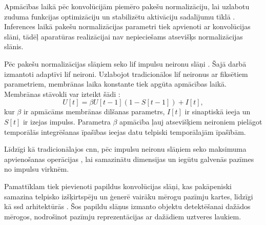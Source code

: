 Apmācības laikā pēc konvolūcijām piemēro pakešu normalizāciju, lai uzlabotu zuduma funkcijas optimizāciju un stabilizētu aktivāciju sadalījumu tīklā \cite{ioffe2015}. Inferences laikā pakešu normalizācijas parametri tiek apvienoti ar konvolūcijas slāni, tādēļ aparatūras realizācijai nav nepieciešams atsevišķs normalizācijas slānis.

Pēc pakešu normalizācijas slāņiem seko \Gls{lif} impulsu neironu slāņi \cite{Fang2021}. Šajā darbā izmantoti adaptīvi \Gls{lif} neironi. Uzlabojot tradicionālos \Gls{lif} neironus ar fiksētiem parametriem, membrānas laika konstante tiek apgūta apmācības laikā. Membrānas stāvokli var izteikt šādi \cite{Fang2021}:
\begin{equation}
    U[t] = \beta U[t-1](1-S[t-1]) + I[t],
\end{equation}
kur \(\beta\) ir apmācāms membrānas dilšanas parametrs, \(I[t]\) ir sinaptiskā ieeja un \(S[t]\) ir izejas impulss. Parametra \(\beta\) apmācība ļauj atsevišķiem neironiem pielāgot temporālās integrēšanas īpašības ieejas datu telpiski temporālajām īpašībām.

Līdzīgi kā tradicionālajos \Gls{cnn}, pēc impulsu neironu slāņiem seko maksimuma apvienošanas operācijas \cite{Fang2021}, lai
samazinātu dimensijas un iegūtu galvenās pazīmes no impulsu virknēm.

Pamattīklam tiek pievienoti papildus konvolūcijas slāņi, kas pakāpeniski samazina telpisko izšķirtspēju un ģenerē vairāku
mērogu pazīmju kartes, līdzīgi kā \Gls{ssd} arhitektūrās \cite{liu2016}. Šos papildu slāņus izmanto objektu detektēšanai
dažādos mērogos, nodrošinot pazīmju reprezentācijas ar dažādiem uztveres laukiem.


